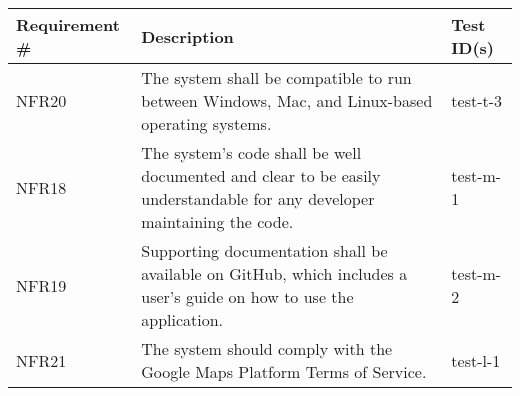 \documentclass[12pt, titlepage]{article}
\begin{document}
  \newpage	
  
\begin{table}[!hbp]
	
	\begin{tabular}{|p{3.5cm}|p{6.5cm}|p{4.5cm}|}

	\hline
	\textbf{Requirement \#} & \textbf{Description}                                                                                                                                                                  & \textbf{Test ID(s)}                                                                                          \\ \hline	
	NFR20                     & The system shall be compatible to run between Windows, Mac, and Linux-based operating systems.                                                                                                       & test-t-3                                                                                          \\ \hline
	NFR18                    & The system's code shall be well documented and clear to be easily understandable for any developer maintaining the code.                                                                                                        & test-m-1                                                                                          \\ \hline
	NFR19                    & Supporting documentation shall be available on GitHub, which includes a user's guide on how to use the application.                                                                                                        & test-m-2                                                                                          \\ \hline
	NFR21                     & The system should comply with the Google Maps Platform Terms of Service.                                                                                                        & test-l-1                                                                                          \\ \hline
		\end{tabular}
	
  \end{table}

\newpage





\newpage
\end{document}
